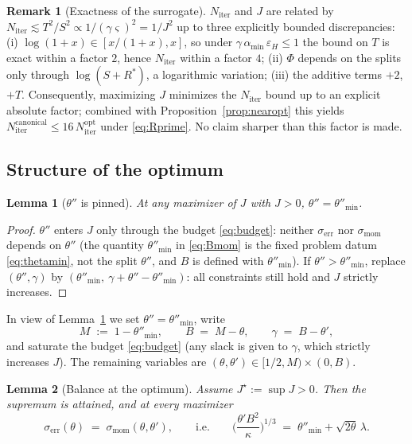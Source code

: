 \documentclass[11pt,a4paper]{article}
\theoremstyle{plain}
\newtheorem{lemma}{Lemma}
\theoremstyle{definition}
\newtheorem{remark}{Remark}
\newcommand{\eps}{\varepsilon}
\newcommand{\epsH}{\eps_{H}}
\newcommand{\Rstar}{R^{*}}
\newcommand{\Niter}{N_{\mathrm{iter}}}
\newcommand{\serr}{\sigma_{\mathrm{err}}}
\newcommand{\smom}{\sigma_{\mathrm{mom}}}
\newcommand{\thetamin}{\theta''_{\min}}
\newcommand{\amin}{\alpha_{\min}}
\begin{document}
\begin{remark}[Exactness of the surrogate]\label{rem:surrogate}
$\Niter$ and $J$ are related by
$\Niter \lesssim T^2/S^2 \propto 1/(\gamma\varsigma)^2 = 1/J^2$ up to three
explicitly bounded discrepancies: (i) $\log(1+x)\in[x/(1+x),x]$, so under
$\gamma\,\amin\,\epsH\le 1$ the bound on $T$ is exact within a factor $2$,
hence $\Niter$ within a factor $4$; (ii) $\Phi$ depends on the splits only
through $\log(S+\Rstar)$, a logarithmic variation; (iii) the additive
terms $+2$, $+T$. Consequently, maximizing $J$ minimizes the
$\Niter$ bound up to an explicit absolute factor; combined with
Proposition~\ref{prop:nearopt} this yields
$\Niter^{\mathrm{canonical}} \le 16\,\Niter^{\mathrm{opt}}$
under \eqref{eq:Rprime}. No claim sharper than this factor is made.
\end{remark}

\subsection{Structure of the optimum}

\begin{lemma}[$\theta''$ is pinned]\label{lem:thetapp}
At any maximizer of $J$ with $J>0$, $\theta'' = \thetamin$.
\end{lemma}

\begin{proof}
$\theta''$ enters $J$ only through the budget \eqref{eq:budget}: neither
$\serr$ nor $\smom$ depends on $\theta''$ (the quantity $\thetamin$ in
\eqref{eq:Bmom} is the fixed problem datum \eqref{eq:thetamin}, not the split
$\theta''$, and $B$ is defined with $\thetamin$). If $\theta'' > \thetamin$,
replace $(\theta'',\gamma)$ by $(\thetamin,\ \gamma + \theta''-\thetamin)$:
all constraints still hold and $J$ strictly increases.
\end{proof}

In view of Lemma~\ref{lem:thetapp} we set $\theta'' = \thetamin$, write
\begin{equation}\label{eq:MB}
M \;:=\; 1 - \thetamin, \qquad B \;=\; M - \theta,
\qquad \gamma \;=\; B - \theta' ,
\end{equation}
and saturate the budget \eqref{eq:budget} (any slack is given to $\gamma$,
which strictly increases $J$). The remaining variables are
$(\theta,\theta') \in [1/2, M)\times(0, B)$.

\begin{lemma}[Balance at the optimum]\label{lem:balance}
Assume $J^\star := \sup J > 0$. Then the supremum is attained, and at every
maximizer
\begin{equation}\label{eq:balance}
\serr(\theta) \;=\; \smom(\theta,\theta'),
\qquad\text{i.e.}\qquad
\Big(\frac{\theta' B^2}{\kappa}\Big)^{1/3}
\;=\; \thetamin + \sqrt{2\theta}\,\lambda .
\end{equation}
\end{lemma}
\end{document}
